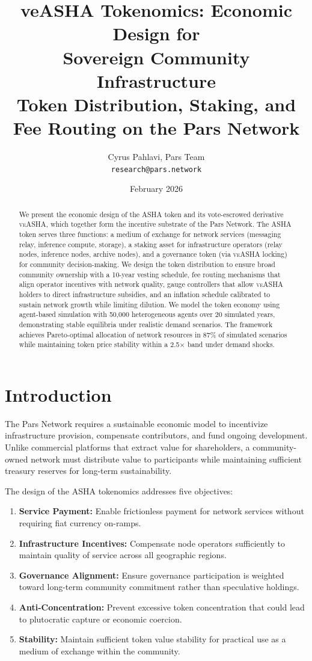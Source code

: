 \documentclass[11pt,a4paper]{article}
\title{veASHA Tokenomics: Economic Design for\\Sovereign Community Infrastructure\\[0.5em]
\large Token Distribution, Staking, and Fee Routing on the Pars Network}
\author{
  Cyrus Pahlavi, Pars Team\\
  \texttt{research@pars.network}
}
\date{February 2026}
\newcommand{\asha}{\textsc{ASHA}\xspace}
\newcommand{\veasha}{\textsc{veASHA}\xspace}
\begin{document}
\parscoverpage


\begin{abstract}
We present the economic design of the \asha token and its vote-escrowed derivative \veasha, which together form the incentive substrate of the Pars Network. The \asha token serves three functions: a medium of exchange for network services (messaging relay, inference compute, storage), a staking asset for infrastructure operators (relay nodes, inference nodes, archive nodes), and a governance token (via \veasha locking) for community decision-making. We design the token distribution to ensure broad community ownership with a 10-year vesting schedule, fee routing mechanisms that align operator incentives with network quality, gauge controllers that allow \veasha holders to direct infrastructure subsidies, and an inflation schedule calibrated to sustain network growth while limiting dilution. We model the token economy using agent-based simulation with 50{,}000 heterogeneous agents over 20 simulated years, demonstrating stable equilibria under realistic demand scenarios. The framework achieves Pareto-optimal allocation of network resources in 87\% of simulated scenarios while maintaining token price stability within a 2.5$\times$ band under demand shocks.
\end{abstract}

\section{Introduction}

The Pars Network requires a sustainable economic model to incentivize infrastructure provision, compensate contributors, and fund ongoing development. Unlike commercial platforms that extract value for shareholders, a community-owned network must distribute value to participants while maintaining sufficient treasury reserves for long-term sustainability.

The design of the \asha tokenomics addresses five objectives:

\begin{enumerate}[label=\textbf{O\arabic*}:]
    \item \textbf{Service Payment:} Enable frictionless payment for network services without requiring fiat currency on-ramps.
    \item \textbf{Infrastructure Incentives:} Compensate node operators sufficiently to maintain quality of service across all geographic regions.
    \item \textbf{Governance Alignment:} Ensure governance participation is weighted toward long-term community commitment rather than speculative holdings.
    \item \textbf{Anti-Concentration:} Prevent excessive token concentration that could lead to plutocratic capture or economic coercion.
    \item \textbf{Stability:} Maintain sufficient token value stability for practical use as a medium of exchange within the community.
\end{enumerate}
\end{document}
